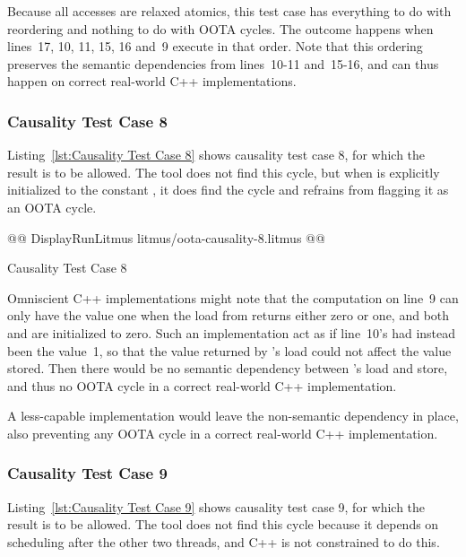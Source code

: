 \documentclass[10]{article}
\begin{document}
Because all accesses are relaxed atomics, this test case has everything
to do with reordering and nothing to do with OOTA cycles.
The outcome happens when lines~17, 10, 11, 15, 16 and~9 execute in that
order.
Note that this ordering preserves the semantic dependencies from
lines~10-11 and~15-16, and can thus happen on correct real-world
C++ implementations.

\subsubsection{Causality Test Case 8}
\label{app:Causality Test Case 8}

Listing~\ref{lst:Causality Test Case 8}
shows causality test case 8, for which the 
result is to be allowed.
The  tool does not find this cycle, but when  is explicitly
initialized to the constant , it does find the cycle and refrains
from flagging it as an OOTA cycle.

\begin{listing}[tbp]
@@ DisplayRunLitmus litmus/oota-causality-8.litmus @@
\caption{Causality Test Case 8}
\label{lst:Causality Test Case 8}
\end{listing}

Omniscient C++ implementations might note that the computation on line~9
can only have the value one when the load from  returns either
zero or one, and both  and  are initialized to zero.
Such an implementation act as if line~10's  had instead been
the value~1, so that the value returned by 's load could not
affect the value stored.
Then there would be no semantic dependency between 's load
and store, and thus no OOTA cycle in a correct real-world C++
implementation.

A less-capable implementation would leave the non-semantic dependency
in place, also preventing any OOTA cycle in a correct real-world C++
implementation.

\subsubsection{Causality Test Case 9}
\label{app:Causality Test Case 9}

Listing~\ref{lst:Causality Test Case 9}
shows causality test case 9, for which the 
result is to be allowed.
The  tool does not find this cycle because it depends on
scheduling  after the other two threads, and C++ is not
constrained to do this.
\end{document}
